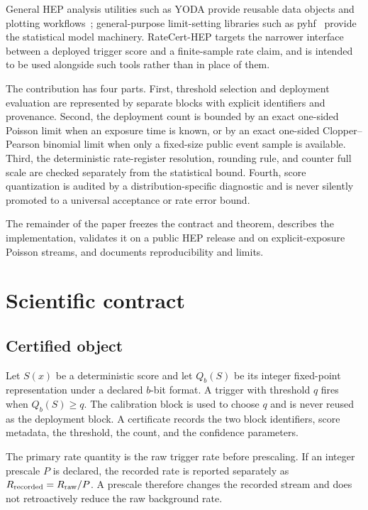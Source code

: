 \documentclass[preprint,12pt]{elsarticle}
\begin{document}
General HEP analysis utilities such as YODA provide reusable data objects and
plotting workflows~\cite{YODA2}; general-purpose limit-setting libraries such as
pyhf~\cite{pyhf2021} provide the statistical model machinery.  RateCert-HEP
targets the narrower interface between a deployed trigger score and a
finite-sample rate claim, and is intended to be used alongside such tools rather
than in place of them.

The contribution has four parts.  First, threshold selection and deployment
evaluation are represented by separate blocks with explicit identifiers and
provenance.  Second, the deployment count is bounded by an exact one-sided
Poisson limit when an exposure time is known, or by an exact one-sided
Clopper--Pearson binomial limit when only a fixed-size public event sample is
available.  Third, the deterministic rate-register resolution, rounding rule,
and counter full scale are checked separately from the statistical bound.
Fourth, score quantization is audited by a distribution-specific diagnostic and
is never silently promoted to a universal acceptance or rate error bound.

The remainder of the paper freezes the contract and theorem, describes the
implementation, validates it on a public HEP release and on explicit-exposure
Poisson streams, and documents reproducibility and limits.

\section{Scientific contract}
\label{sec:contract}

\subsection{Certified object}

Let $S(x)$ be a deterministic score and let $Q_b(S)$ be its integer fixed-point
representation under a declared $b$-bit format.  A trigger with threshold $q$
fires when $Q_b(S)\ge q$.  The calibration block is used to choose $q$ and is
never reused as the deployment block.  A certificate records the two block
identifiers, score metadata, the threshold, the count, and the confidence
parameters.

The primary rate quantity is the raw trigger rate before prescaling.  If an
integer prescale $P$ is declared, the recorded rate is reported separately as
$R_{\rm recorded}=R_{\rm raw}/P$.  A prescale therefore changes the recorded
stream and does not retroactively reduce the raw background rate.
\end{document}
